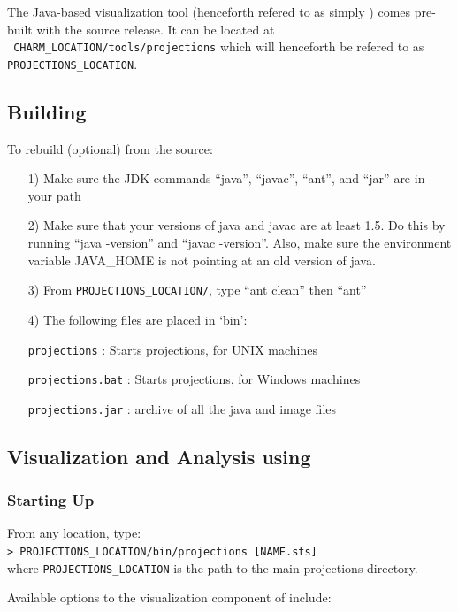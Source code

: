 \documentclass[10pt]{article}
\begin{document}
The \projections{} Java-based visualization tool (henceforth refered
to as simply \projections{}) comes pre-built with the \charmpp{}
source release. It can be located at \\ {\tt
CHARM\_LOCATION/tools/projections} which will henceforth be refered to
as {\tt PROJECTIONS\_LOCATION}.

\subsection{Building \projections{}}

To rebuild \projections{} (optional) from the source:

\begin{enumerate}
\item[1)]
   Make sure the JDK commands ``java'', ``javac'', ``ant'',  and ``jar''
   are in your path  
\item[2)]
   Make sure that your versions of java and javac are at least 1.5. Do this by running ``java -version'' and ``javac -version''. Also, make sure the environment variable JAVA\_HOME is not pointing at an old version of java.
\item[3)]
   From {\tt PROJECTIONS\_LOCATION/}, type ``ant clean'' then ``ant''
\item[4)]
   The following files are placed in `bin':

      {\tt projections}           : Starts projections, for UNIX machines

      {\tt projections.bat}       : Starts projections, for Windows machines

      {\tt projections.jar}       : archive of all the java and image files
\end{enumerate}

\subsection{Visualization and Analysis using \projections{}}

\subsubsection{Starting Up}
\label{sec:startingUp}
From any location, type: \\
{\tt > PROJECTIONS\_LOCATION/bin/projections [NAME.sts]} \\
where {\tt PROJECTIONS\_LOCATION} is the path to the main projections
directory.

Available options to the visualization component of \projections{} include:
\end{document}
